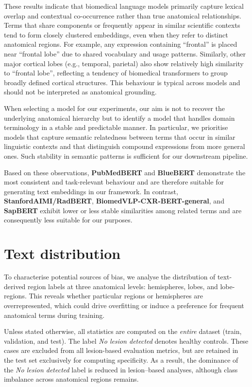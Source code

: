 \documentclass[FCD_GNN.tex]{subfiles}
\begin{document}
These results indicate that biomedical language models primarily capture lexical overlap and contextual co-occurrence rather than true anatomical relationships. 
Terms that share components or frequently appear in similar scientific contexts tend to form closely clustered embeddings, even when they refer to distinct anatomical regions. 
For example, any expression containing ``frontal'' is placed near ``frontal lobe'' due to shared vocabulary and usage patterns. 
Similarly, other major cortical lobes (e.g., temporal, parietal) also show relatively high similarity to ``frontal lobe'', reflecting a tendency of biomedical transformers to group broadly defined cortical structures. 
This behaviour is typical across models and should not be interpreted as anatomical grounding.

When selecting a model for our experiments, our aim is not to recover the underlying anatomical hierarchy but to identify a model that handles domain terminology in a stable and predictable manner. 
In particular, we prioritise models that capture semantic relatedness between terms that occur in similar linguistic contexts and that distinguish compound expressions from more general ones. Such stability in semantic patterns is sufficient for our downstream pipeline.

Based on these observations, \textbf{PubMedBERT} and \textbf{BlueBERT} demonstrate the most consistent and task-relevant behaviour and are therefore suitable for generating text embeddings in our framework. In contrast, \textbf{StanfordAIMI/RadBERT}, \textbf{BiomedVLP-CXR-BERT-general}, and \textbf{SapBERT} exhibit lower or less stable similarities among related terms and are consequently less suitable for our purposes.

\clearpage
\section*{Text distribution} \label{sec:text_distribution}

To characterise potential sources of bias, we analyse the distribution of text-derived region labels at three anatomical levels: hemispheres, lobes, and lobe-regions. This reveals whether particular regions or hemispheres are overrepresented, which could drive overfitting or induce a preference for frequent anatomical terms during training. 

Unless stated otherwise, all statistics are computed on the \emph{entire} dataset (train, validation, and test). 
The label \emph{No lesion detected} denotes healthy controls. 
These cases are excluded from all lesion-based evaluation metrics, 
but are retained in the test set exclusively for computing specificity.
As a result, the dominance of the \emph{No lesion detected} label is reduced in lesion--based analyses, 
although class imbalance across anatomical regions remains.
\end{document}
